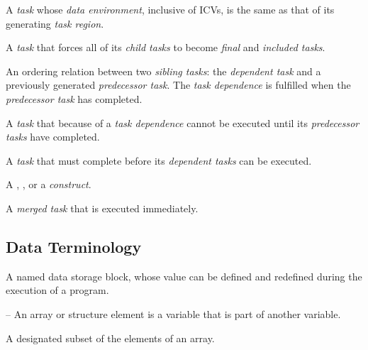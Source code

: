 \glossarydefstart
A \emph{task} whose \emph{data environment}, inclusive of ICVs, is the same as that of its 
generating \emph{task region}.
\glossarydefend

\glossarydefstart
A \emph{task} that forces all of its \emph{child tasks} to become \emph{final} and \emph{included tasks}.
\glossarydefend

\glossarydefstart
An ordering relation between two \emph{sibling tasks}: the \emph{dependent task} and a 
previously generated \emph{predecessor task}. The \emph{task dependence} is fulfilled when the 
\emph{predecessor task} has completed.
\glossarydefend

\begin{samepage}
\glossarydefstart
A \emph{task} that because of a \emph{task dependence} cannot be executed until its \emph{predecessor 
tasks} have completed.
\glossarydefend
\end{samepage}

\glossarydefstart
A \emph{task} that must complete before its \emph{dependent tasks} can be executed.
\glossarydefend

\glossarydefstart
A , , or a  \emph{construct}.
\glossarydefend
\bigskip

\glossarydefstart
A \emph{merged task} that is executed immediately.
\glossarydefend








\subsection{Data Terminology}
\glossarydefstart
A named data storage block, whose value can be defined and redefined during the 
execution of a program.

\begin{adjustwidth}{-0.75in}{0in}
\notestart
\noteheader – An array or structure element is a variable that is part of another variable.
\noteend
\end{adjustwidth}
\glossarydefend

\glossarydefstart
A designated subset of the elements of an array. 
\glossarydefend

